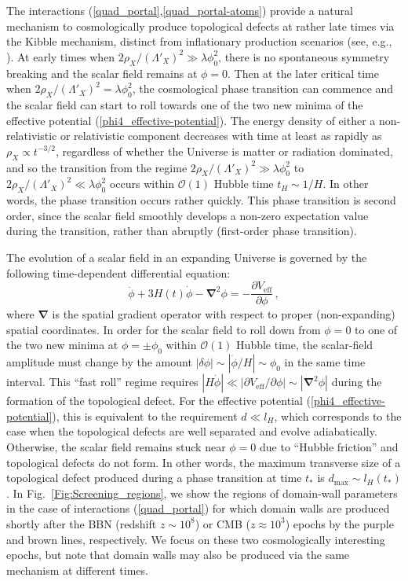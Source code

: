 \documentclass[aps,prd,onecolumn,nofootinbib]{revtex4-2} %
\renewcommand{\v}[1]{\boldsymbol{#1}}		%
\begin{document}
The interactions (\ref{quad_portal},\ref{quad_portal-atoms}) provide a natural mechanism to cosmologically produce topological defects at rather late times via the Kibble mechanism, distinct from inflationary production scenarios (see, e.g., \cite{Dolgov-Rudenko_2018-DW_cosmo}). 
At early times when $2 \rho_X / (\Lambda'_X)^2 \gg \lambda \phi_0^2$, there is no spontaneous symmetry breaking and the scalar field remains at $\phi = 0$. 
Then at the later critical time when $2 \rho_X / (\Lambda'_X)^2 = \lambda \phi_0^2$, the cosmological phase transition can commence and the scalar field can start to roll towards one of the two new minima of the effective potential (\ref{phi4_effective-potential}). 
The energy density of either a non-relativistic or relativistic component decreases with time at least as rapidly as $\rho_X \propto t^{-3/2}$, regardless of whether the Universe is matter or radiation dominated, and so the transition from the regime $2 \rho_X / (\Lambda'_X)^2 \gg \lambda \phi_0^2$ to $2 \rho_X / (\Lambda'_X)^2 \ll \lambda \phi_0^2$ occurs within $\mathcal{O}(1)$ Hubble time $t_H \sim 1/H$. 
In other words, the phase transition occurs rather quickly. 
This phase transition is second order, since the scalar field smoothly develops a non-zero expectation value during the transition, rather than abruptly (first-order phase transition). 

The evolution of a scalar field in an expanding Universe is governed by the following time-dependent differential equation: 
\begin{equation}
\label{scalar_field_evolution_DE}
\ddot{\phi} + 3H(t) \dot{\phi} - \v{\nabla}^2 \phi = -\frac{\partial V_\textrm{eff}}{\partial \phi}  \, , 
\end{equation}
where $\v{\nabla}$ is the spatial gradient operator with respect to proper (non-expanding) spatial coordinates. 
In order for the scalar field to roll down from $\phi = 0$ to one of the two new minima at $\phi = \pm \phi_0$ within $\mathcal{O}(1)$ Hubble time, the scalar-field amplitude must change by the amount $|\delta \phi| \sim |\dot{\phi}/H| \sim \phi_0$ in the same time interval. 
This ``fast roll'' regime requires $|H \dot{\phi}| \ll |\partial V_\textrm{eff} / \partial \phi| \sim |\v{\nabla}^2 \phi|$ during the formation of the topological defect. 
For the effective potential (\ref{phi4_effective-potential}), this is equivalent to the requirement $d \ll l_H$, which corresponds to the case when the topological defects are well separated and evolve adiabatically. 
Otherwise, the scalar field remains stuck near $\phi = 0$ due to ``Hubble friction'' and topological defects do not form. 
In other words, the maximum transverse size of a topological defect produced during a phase transition at time $t_*$ is $d_\textrm{max} \sim l_H(t_*)$. 
In Fig.~\ref{Fig:Screening_regions}, we show the regions of domain-wall parameters in the case of interactions (\ref{quad_portal}) for which domain walls are produced shortly after the BBN (redshift $z \sim 10^8$) or CMB ($z \approx 10^3$) epochs by the purple and brown lines, respectively. 
We focus on these two cosmologically interesting epochs, but note that domain walls may also be produced via the same mechanism at different times. 
\end{document}
